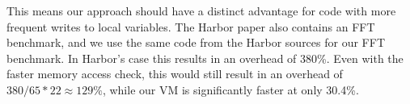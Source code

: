  This means our approach should have a distinct advantage for code with more frequent writes to local variables. The Harbor paper also contains an FFT benchmark, and we use the same code from the Harbor sources for our FFT benchmark. In Harbor's case this results in an overhead of 380\%. Even with the faster memory access check, this would still result in an overhead of $380 / 65 * 22 \approx 129\%$, while our VM is significantly faster at only 30.4\%.

